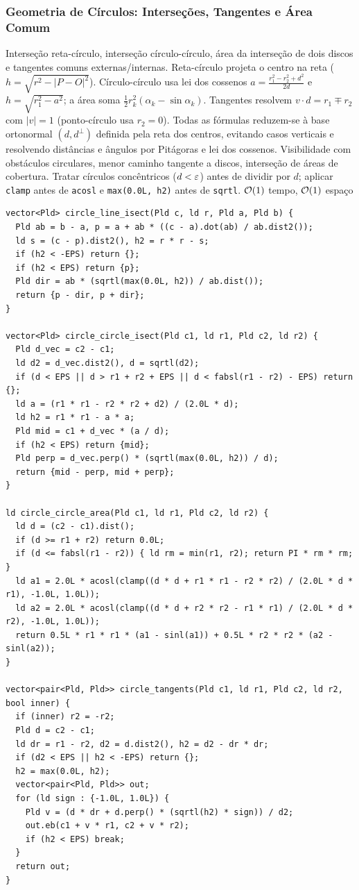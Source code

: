 \subsubsection{Geometria de Círculos: Interseções, Tangentes e Área Comum}
\algobox
  {Interseção reta-círculo, interseção círculo-círculo, área da interseção de dois discos e tangentes comuns externas/internas.}
  {Reta-círculo projeta o centro na reta ($h = \sqrt{r^2 - |P - O|^2}$). Círculo-círculo usa lei dos cossenos $a = \frac{r_1^2 - r_2^2 + d^2}{2d}$ e $h = \sqrt{r_1^2 - a^2}$; a área soma $\frac{1}{2} r_k^2 (\alpha_k - \sin\alpha_k)$. Tangentes resolvem $v \cdot d = r_1 \mp r_2$ com $|v| = 1$ (ponto-círculo usa $r_2 = 0$).}
  {Todas as fórmulas reduzem-se à base ortonormal $(d, d^\perp)$ definida pela reta dos centros, evitando casos verticais e resolvendo distâncias e ângulos por Pitágoras e lei dos cossenos.}
  {Visibilidade com obstáculos circulares, menor caminho tangente a discos, interseção de áreas de cobertura.}
  {Tratar círculos concêntricos ($d < \varepsilon$) antes de dividir por $d$; aplicar \texttt{clamp} antes de \texttt{acosl} e \texttt{max(0.0L, h2)} antes de \texttt{sqrtl}.}
  {$\mathcal{O}(1)$ tempo, $\mathcal{O}(1)$ espaço}

\begin{lstlisting}
vector<Pld> circle_line_isect(Pld c, ld r, Pld a, Pld b) {
  Pld ab = b - a, p = a + ab * ((c - a).dot(ab) / ab.dist2());
  ld s = (c - p).dist2(), h2 = r * r - s;
  if (h2 < -EPS) return {};
  if (h2 < EPS) return {p};
  Pld dir = ab * (sqrtl(max(0.0L, h2)) / ab.dist());
  return {p - dir, p + dir};
}

vector<Pld> circle_circle_isect(Pld c1, ld r1, Pld c2, ld r2) {
  Pld d_vec = c2 - c1;
  ld d2 = d_vec.dist2(), d = sqrtl(d2);
  if (d < EPS || d > r1 + r2 + EPS || d < fabsl(r1 - r2) - EPS) return {};
  ld a = (r1 * r1 - r2 * r2 + d2) / (2.0L * d);
  ld h2 = r1 * r1 - a * a;
  Pld mid = c1 + d_vec * (a / d);
  if (h2 < EPS) return {mid};
  Pld perp = d_vec.perp() * (sqrtl(max(0.0L, h2)) / d);
  return {mid - perp, mid + perp};
}

ld circle_circle_area(Pld c1, ld r1, Pld c2, ld r2) {
  ld d = (c2 - c1).dist();
  if (d >= r1 + r2) return 0.0L;
  if (d <= fabsl(r1 - r2)) { ld rm = min(r1, r2); return PI * rm * rm; }
  ld a1 = 2.0L * acosl(clamp((d * d + r1 * r1 - r2 * r2) / (2.0L * d * r1), -1.0L, 1.0L));
  ld a2 = 2.0L * acosl(clamp((d * d + r2 * r2 - r1 * r1) / (2.0L * d * r2), -1.0L, 1.0L));
  return 0.5L * r1 * r1 * (a1 - sinl(a1)) + 0.5L * r2 * r2 * (a2 - sinl(a2));
}

vector<pair<Pld, Pld>> circle_tangents(Pld c1, ld r1, Pld c2, ld r2, bool inner) {
  if (inner) r2 = -r2;
  Pld d = c2 - c1;
  ld dr = r1 - r2, d2 = d.dist2(), h2 = d2 - dr * dr;
  if (d2 < EPS || h2 < -EPS) return {};
  h2 = max(0.0L, h2);
  vector<pair<Pld, Pld>> out;
  for (ld sign : {-1.0L, 1.0L}) {
    Pld v = (d * dr + d.perp() * (sqrtl(h2) * sign)) / d2;
    out.eb(c1 + v * r1, c2 + v * r2);
    if (h2 < EPS) break;
  }
  return out;
}
\end{lstlisting}
